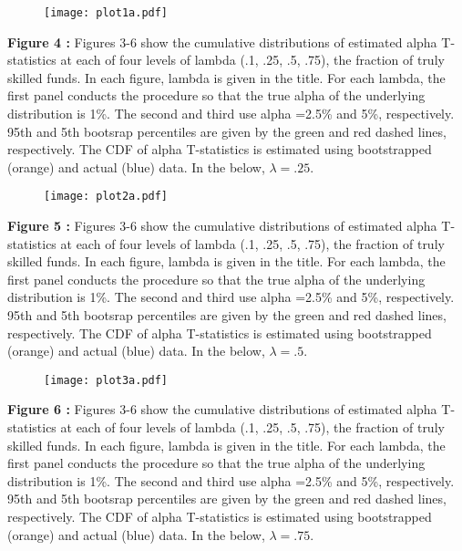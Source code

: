 \documentclass{article}
\begin{document}
\begin{center}
 \begin{figure}[h!]
 \texttt{[image: plot1a.pdf]}\label{fig:plot1a}
 \end{figure}
 \end{center}
\clearpage 
\textbf{Figure 4 : }Figures 3-6 show the cumulative distributions of estimated alpha T-statistics at each of four levels of lambda (.1, .25, .5, .75), the fraction of truly skilled funds.  In each figure, lambda is given in the title.  For each lambda, the first panel conducts the procedure so that the true alpha of the underlying distribution is 1\%.  The second and third use alpha =2.5\% and 5\%, respectively.  95th and 5th bootsrap percentiles are given by the green and red dashed lines, respectively. The CDF of alpha T-statistics is estimated using bootstrapped (orange) and actual (blue) data.  In the below, $\lambda=.25$.
\begin{center}
 \begin{figure}[h!]
 \texttt{[image: plot2a.pdf]}\label{fig:plot2a}
 \end{figure}
 \end{center}
\clearpage 
\textbf{Figure 5 : }Figures 3-6 show the cumulative distributions of estimated alpha T-statistics at each of four levels of lambda (.1, .25, .5, .75), the fraction of truly skilled funds.  In each figure, lambda is given in the title.  For each lambda, the first panel conducts the procedure so that the true alpha of the underlying distribution is 1\%.  The second and third use alpha =2.5\% and 5\%, respectively.  95th and 5th bootsrap percentiles are given by the green and red dashed lines, respectively. The CDF of alpha T-statistics is estimated using bootstrapped (orange) and actual (blue) data.  In the below, $\lambda=.5$.
\begin{center}
 \begin{figure}[h!]
 \texttt{[image: plot3a.pdf]}\label{fig:plot3a}
 \end{figure}
 \end{center}
\clearpage 
\textbf{Figure 6 : }Figures 3-6 show the cumulative distributions of estimated alpha T-statistics at each of four levels of lambda (.1, .25, .5, .75), the fraction of truly skilled funds.  In each figure, lambda is given in the title.  For each lambda, the first panel conducts the procedure so that the true alpha of the underlying distribution is 1\%.  The second and third use alpha =2.5\% and 5\%, respectively.  95th and 5th bootsrap percentiles are given by the green and red dashed lines, respectively. The CDF of alpha T-statistics is estimated using bootstrapped (orange) and actual (blue) data.  In the below, $\lambda=.75$.
\end{document}
